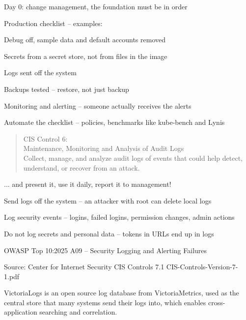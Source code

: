 \documentclass[Screen16to9,17pt]{foils}
\begin{document}
\begin{list2}
\item Day 0: change management, the foundation must be in order
\item Production checklist -- examples:
\begin{list2}
\item Debug off, sample data and default accounts removed
\item Secrets from a secret store, not from files in the image
\item Logs sent off the system
\item Backups tested -- restore, not just backup
\item Monitoring and alerting -- someone actually receives the alerts
\end{list2}
\item Automate the checklist -- policies, benchmarks like kube-bench and Lynis
\end{list2}



\begin{quote}
CIS Control 6:\\
Maintenance, Monitoring and Analysis of Audit Logs\\
Collect, manage, and analyze audit logs of events that could help detect, understand, or recover from an attack.
\end{quote}

\begin{list1}
\item ... and present it, use it daily, report it to management!
\item Send logs off the system -- an attacker with root can delete local logs
\item Log security events -- logins, failed logins, permission changes, admin actions
\item Do not log secrets and personal data -- tokens in URLs end up in logs
\item OWASP Top 10:2025 A09 -- Security Logging and Alerting Failures
\end{list1}

Source: Center for Internet Security CIS Controls 7.1 CIS-Controls-Version-7-1.pdf




VictoriaLogs is an open source log database from VictoriaMetrics, used as the central store that many systems send their logs into, which enables cross-application searching and correlation.
\end{document}
